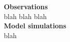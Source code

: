 \documentclass{nature}
\begin{document}







\begin{methods}
\textbf{Observations} \\
blah blah blah
\\
\textbf{Model simulations}\\
blah
\end{methods}
\end{document}
